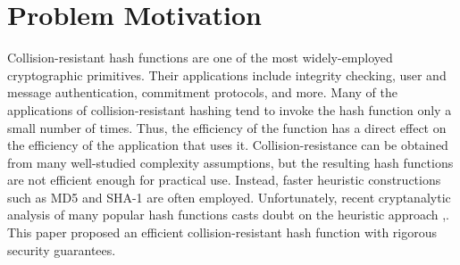 \section{Problem Motivation}
Collision-resistant hash functions
are one of the most widely-employed cryptographic primitives. Their applications include integrity
checking, user and message authentication, commitment protocols, and more.
Many of the applications of collision-resistant hashing tend to invoke the hash function only a
small number of times. Thus, the efficiency of the function has a direct effect on the efficiency of the
application that uses it. Collision-resistance can be obtained from many well-studied complexity assumptions, but the
resulting hash functions are not efficient enough for practical use. Instead, faster heuristic constructions such as MD5 and SHA-1 are often employed. Unfortunately, recent cryptanalytic analysis of many popular hash functions casts doubt on the heuristic approach \cite{Wang:2005:FCF:2153419.2153421},\cite{Wang:2005:BMO:2154598.2154601}. This paper proposed an efficient collision-resistant hash function with rigorous security guarantees.